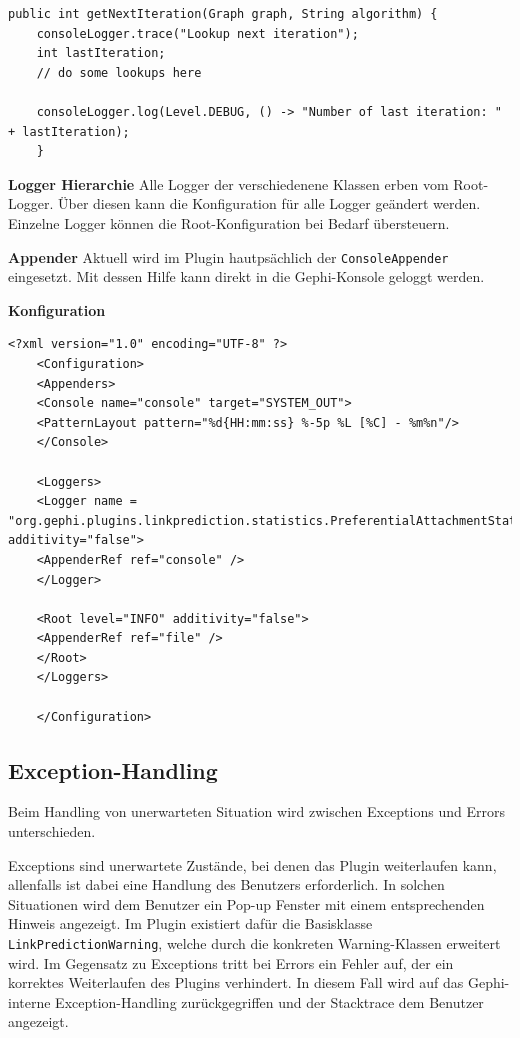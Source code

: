 \begin{lstlisting}[caption={Log-Einträge erzeugen},label=lstLoggerUse]
    public int getNextIteration(Graph graph, String algorithm) {
    consoleLogger.trace("Lookup next iteration");
    int lastIteration;
    // do some lookups here

    consoleLogger.log(Level.DEBUG, () -> "Number of last iteration: " + lastIteration);
    }
\end{lstlisting}

\textbf{Logger Hierarchie}
Alle Logger der verschiedenene Klassen erben vom Root-Logger. Über diesen kann die Konfiguration für alle Logger geändert werden.
Einzelne Logger können die Root-Konfiguration bei Bedarf übersteuern.

\textbf{Appender}
Aktuell wird im Plugin hautpsächlich der \texttt{ConsoleAppender} eingesetzt.
Mit dessen Hilfe kann direkt in die Gephi-Konsole geloggt werden.

\textbf{Konfiguration}

\begin{lstlisting}[caption={log4j.xml},label=lstLoggerCreate]
    <?xml version="1.0" encoding="UTF-8" ?>
    <Configuration>
    <Appenders>
    <Console name="console" target="SYSTEM_OUT">
    <PatternLayout pattern="%d{HH:mm:ss} %-5p %L [%C] - %m%n"/>
    </Console>

    <Loggers>
    <Logger name = "org.gephi.plugins.linkprediction.statistics.PreferentialAttachmentStatistics" additivity="false">
    <AppenderRef ref="console" />
    </Logger>

    <Root level="INFO" additivity="false">
    <AppenderRef ref="file" />
    </Root>
    </Loggers>

    </Configuration>
\end{lstlisting}

\subsection{Exception-Handling}
\label{exceptionhandling}

Beim Handling von unerwarteten Situation wird zwischen Exceptions und Errors unterschieden.

Exceptions sind unerwartete Zustände, bei denen das Plugin weiterlaufen kann, allenfalls ist dabei eine Handlung des Benutzers erforderlich.
In solchen Situationen wird dem Benutzer ein Pop-up Fenster mit einem entsprechenden Hinweis angezeigt.
Im Plugin existiert dafür die Basisklasse \texttt{LinkPredictionWarning}, welche durch die konkreten Warning-Klassen erweitert wird.
Im Gegensatz zu Exceptions tritt bei Errors ein Fehler auf, der ein korrektes Weiterlaufen des Plugins verhindert.
In diesem Fall wird auf das Gephi-interne Exception-Handling zurückgegriffen und der Stacktrace dem Benutzer angezeigt.

